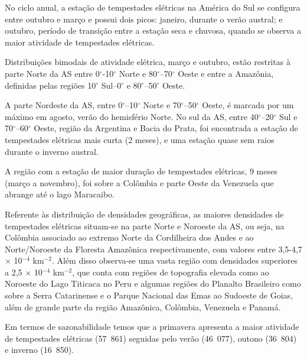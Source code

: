 
No ciclo anual, a estação de tempestades elétricas na América do Sul se configura entre outubro e março e possui dois picos: janeiro, durante o verão austral; e outubro, período de transição entre a estação seca e chuvosa, quando se observa a maior atividade de tempestades elétricas. 

Distribuições bimodais de atividade elétrica, março e outubro, estão restritas à parte Norte da AS entre 0$^{\circ}$-10$^{\circ}$ Norte e 80$^{\circ}$--70$^{\circ}$ Oeste e entre a Amazônia, definidas pelas regiões 10$^{\circ}$ Sul--0$^{\circ}$ e 80$^{\circ}$--50$^{\circ}$ Oeste. 

A parte Nordeste da AS, entre 0$^{\circ}$--10$^{\circ}$ Norte e 70$^{\circ}$--50$^{\circ}$ Oeste, é marcada por um máximo em agosto, verão do hemisfério Norte. No sul da AS,  entre 40$^{\circ}$--20$^{\circ}$ Sul e 70$^{\circ}$--60$^{\circ}$ Oeste, região da Argentina e Bacia do Prata, foi encontrada a estação de tempestades elétricas mais curta (2 meses), e uma estação quase sem raios durante o inverno austral.

A região com a estação de maior duração de tempestades elétricas,  9 meses (março a novembro), foi sobre a Colômbia e parte Oeste da Venezuela que abrange até o lago Maracaibo.  



Referente às distribuição de densidades geográficas, as maiores densidades de tempestades elétricas situam-se na parte Norte e Noroeste da AS, ou seja, na Colômbia associado ao extremo Norte da Cordilheira dos Andes e ao Norte/Noroeste da Floresta Amazônica respectivamente, com valores entre 3,5-4,7 $\times$ 10$^{-4}$ km$^{-2}$. Além disso observa-se uma vasta região com densidades superiores a  2,5 $\times$ 10$^{-4}$ km$^{-2}$, que conta com regiões de topografia elevada como ao Noroeste do Lago Titicaca no Peru e algumas regiões do Planalto Brasileiro como sobre a Serra Catarinense e o Parque Nacional das Emas ao Sudoeste de Goias, além de grande parte da região Amazônica, Colômbia, Venezuela e Panamá.  

Em termos de sazonabilidade temos que a primavera apresenta a maior atividade de tempestades elétricas (57~861) seguidas pelo verão (46~077), outono (36~804) e inverno (16~850). 

